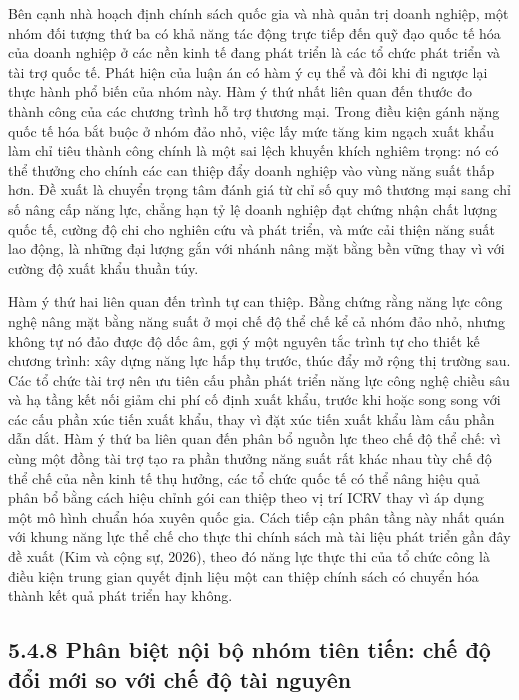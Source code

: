 \documentclass[
  a4paper,
  13pt]{extreport}
\begin{document}
Bên cạnh nhà hoạch định chính sách quốc gia và nhà quản trị doanh
nghiệp, một nhóm đối tượng thứ ba có khả năng tác động trực tiếp đến quỹ
đạo quốc tế hóa của doanh nghiệp ở các nền kinh tế đang phát triển là
các tổ chức phát triển và tài trợ quốc tế. Phát hiện của luận án có hàm
ý cụ thể và đôi khi đi ngược lại thực hành phổ biến của nhóm này. Hàm ý
thứ nhất liên quan đến thước đo thành công của các chương trình hỗ trợ
thương mại. Trong điều kiện gánh nặng quốc tế hóa bắt buộc ở nhóm đảo
nhỏ, việc lấy mức tăng kim ngạch xuất khẩu làm chỉ tiêu thành công chính
là một sai lệch khuyến khích nghiêm trọng: nó có thể thưởng cho chính
các can thiệp đẩy doanh nghiệp vào vùng năng suất thấp hơn. Đề xuất là
chuyển trọng tâm đánh giá từ chỉ số quy mô thương mại sang chỉ số nâng
cấp năng lực, chẳng hạn tỷ lệ doanh nghiệp đạt chứng nhận chất lượng
quốc tế, cường độ chi cho nghiên cứu và phát triển, và mức cải thiện
năng suất lao động, là những đại lượng gắn với nhánh nâng mặt bằng bền
vững thay vì với cường độ xuất khẩu thuần túy.

Hàm ý thứ hai liên quan đến trình tự can thiệp. Bằng chứng rằng năng lực
công nghệ nâng mặt bằng năng suất ở mọi chế độ thể chế kể cả nhóm đảo
nhỏ, nhưng không tự nó đảo được độ dốc âm, gợi ý một nguyên tắc trình tự
cho thiết kế chương trình: xây dựng năng lực hấp thụ trước, thúc đẩy mở
rộng thị trường sau. Các tổ chức tài trợ nên ưu tiên cấu phần phát triển
năng lực công nghệ chiều sâu và hạ tầng kết nối giảm chi phí cố định
xuất khẩu, trước khi hoặc song song với các cấu phần xúc tiến xuất khẩu,
thay vì đặt xúc tiến xuất khẩu làm cấu phần dẫn dắt. Hàm ý thứ ba liên
quan đến phân bổ nguồn lực theo chế độ thể chế: vì cùng một đồng tài trợ
tạo ra phần thưởng năng suất rất khác nhau tùy chế độ thể chế của nền
kinh tế thụ hưởng, các tổ chức quốc tế có thể nâng hiệu quả phân bổ bằng
cách hiệu chỉnh gói can thiệp theo vị trí ICRV thay vì áp dụng một mô
hình chuẩn hóa xuyên quốc gia. Cách tiếp cận phân tầng này nhất quán với
khung năng lực thể chế cho thực thi chính sách mà tài liệu phát triển
gần đây đề xuất (Kim và cộng sự, 2026), theo đó năng lực thực thi của tổ
chức công là điều kiện trung gian quyết định liệu một can thiệp chính
sách có chuyển hóa thành kết quả phát triển hay không.

\hypertarget{phuxe2n-biux1ec7t-nux1ed9i-bux1ed9-nhuxf3m-tiuxean-tiux1ebfn-chux1ebf-ux111ux1ed9-ux111ux1ed5i-mux1edbi-so-vux1edbi-chux1ebf-ux111ux1ed9-tuxe0i-nguyuxean}{%
\subsection{5.4.8 Phân biệt nội bộ nhóm tiên tiến: chế độ đổi mới so với
chế độ tài
nguyên}\label{phuxe2n-biux1ec7t-nux1ed9i-bux1ed9-nhuxf3m-tiuxean-tiux1ebfn-chux1ebf-ux111ux1ed9-ux111ux1ed5i-mux1edbi-so-vux1edbi-chux1ebf-ux111ux1ed9-tuxe0i-nguyuxean}}
\end{document}
